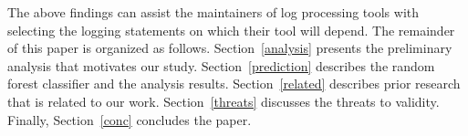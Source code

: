 The above findings can assist the maintainers of log processing tools with selecting the logging statements on which their tool will depend. %
%
%
%
%
%
%
%
%
% 
The remainder of this paper is organized as follows. Section~\ref{analysis} presents the preliminary analysis that motivates our study. Section~\ref{prediction} describes the random forest classifier and the analysis results. Section~\ref{related} describes prior research that is related to our work. Section~\ref{threats} discusses the threats to validity. Finally, Section~\ref{conc} concludes the paper.
 
 
